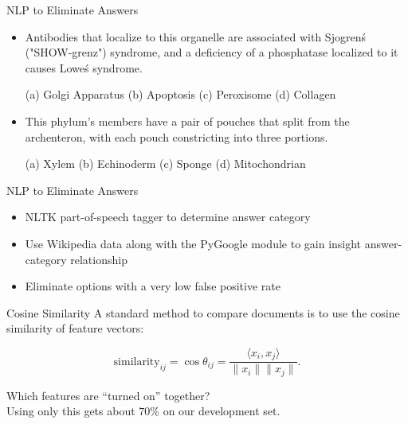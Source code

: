 \documentclass{beamer}
\begin{document}
\begin{frame}{NLP to Eliminate Answers}
   \begin{itemize}
      \item Antibodies that localize to {\color{red}this} {\color{green}organelle} are associated with Sjogren\'s ("SHOW-grenz") syndrome, and a deficiency of a phosphatase localized to it causes Lowe\'s syndrome.

	(a) {\color{green}Golgi Apparatus} (b) Apoptosis (c) {\color{green}Peroxisome} (d) Collagen

      \item {\color{red}This} {\color{green}phylum's} members have a pair of pouches that split from the archenteron, with each pouch constricting into three portions. 

	(a) Xylem (b) {\color{green}Echinoderm} (c) Sponge (d) Mitochondrian
   \end{itemize}
\end{frame}

\begin{frame}{NLP to Eliminate Answers}
   \begin{itemize}
      \item NLTK part-of-speech tagger to determine answer category
      \item Use Wikipedia data along with the PyGoogle module to gain insight answer-category relationship
      \item Eliminate options with a very low false positive rate
   \end{itemize}
\end{frame}

\begin{frame}{Cosine Similarity}
  A standard method to compare documents is to use the cosine similarity of feature vectors:

  \[ \text{similarity}_{ij} = \cos\theta_{ij} = \dfrac{\langle x_i, x_j\rangle}{\|x_i\| \|x_j\|}. \] 

  Which features are ``turned on'' together?\\

  Using only this gets about $70\%$ on our development set.
\end{frame}
\end{document}
